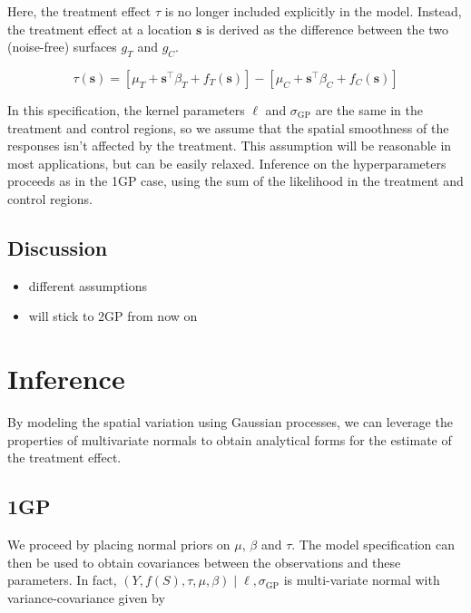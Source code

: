 \documentclass[letter]{article}
\providecommand{\tightlist}{%
      \setlength{\itemsep}{0pt}\setlength{\parskip}{0pt}}
\newcommand{\genericdel}[3]{%
      \left#1#3\right#2
    }
\newcommand{\del}[1]{\genericdel(){#1}}
\newcommand{\sbr}[1]{\genericdel[]{#1}}
\newcommand{\trans}{^{\intercal}}
\newcommand{\sigmaf}{\sigma_{\mathrm{GP}}}
\newcommand{\svec}{\mathbold{s}}
\providecommand{\tightlist}{%
  	  \setlength{\itemsep}{0pt}\setlength{\parskip}{0pt}}
\begin{document}
Here, the treatment effect \(\tau\) is no longer included explicitly in the model. Instead, the treatment effect at a location \(\svec\) is derived as the difference between the two (noise-free) surfaces \(g_T\) and \(g_C\).

\begin{equation}
\tau(\svec) = \sbr{\mu_T + \svec\trans\beta_T + f_T(\svec)} - \sbr{\mu_C + \svec\trans\beta_C + f_C(\svec)}
\end{equation}

In this specification, the kernel parameters \(\ell\) and \(\sigmaf\) are the same in the treatment and control regions, so we assume that the spatial smoothness of the responses isn't affected by the treatment. This assumption will be reasonable in most applications, but can be easily relaxed. Inference on the hyperparameters proceeds as in the 1GP case, using the sum of the likelihood in the treatment and control regions.
    


    	\subsection{Discussion}\label{discussion}

\begin{itemize}
\tightlist
\item
  different assumptions
\item
  will stick to 2GP from now on
\end{itemize}
    


    	\section{Inference}\label{inference}

By modeling the spatial variation using Gaussian processes, we can leverage the properties of multivariate normals to obtain analytical forms for the estimate of the treatment effect.
    


    	\subsection{1GP}\label{gp}

We proceed by placing normal priors on \(\mu\), \(\beta\) and \(\tau\). The model specification can then be used to obtain covariances between the observations and these parameters. In fact, \(\del{Y,f(S),\tau,\mu,\beta} \mid \ell,\sigmaf\) is multi-variate normal with variance-covariance given by
\end{document}
